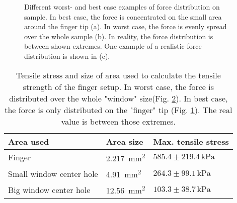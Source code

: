 \begin{figure}[hbt!]
	\centering
	\begin{subfigure}[]{0.3\textwidth}
		\centering
		
		\caption{}
		\label{fig:ZeichnungBerechnungStress_a}
	\end{subfigure}
	\begin{subfigure}[]{0.3\textwidth}
		\centering
		
		\caption{}
		\label{fig:ZeichnungBerechnungStress_b}
	\end{subfigure}
	\begin{subfigure}[]{0.3\textwidth}
		\centering
		
		\caption{}
		\label{fig:ZeichnungBerechnungStress_c}
	\end{subfigure}
	\caption{Different worst- and best case examples of force distribution on sample. In best case, the force is concentrated on the small area around the finger tip (a). In worst case, the force is evenly spread over the whole sample (b). In reality, the force distribution is between shown extremes. One example of a realistic force distribution is shown in (c).}
	\label{fig:ZeichnungBerechnungStress}
\end{figure}


\begin{table}[hbt!]
	\centering
	\begin{tabular}{|l|l|l|}
		\hline
		Area used & Area size & Max. tensile stress\\
		\hline
		\hline
		Finger & \SI{2.217}{\milli\meter\squared} & $585.4\pm219.4\,\si{\kilo\pascal}$ \\ 
		\hline
		Small window center hole & \SI{4.91}{\milli\meter\squared} & $264.3\pm99.1\,\si{\kilo\pascal}$ \\ 
		\hline
		Big window center hole & \SI{12.56}{\milli\meter\squared} & $103.3\pm38.7\,\si{\kilo\pascal}$ \\ 
		\hline
	\end{tabular}
	\caption{Tensile stress and size of area used to calculate the tensile strength of the finger setup. In worst case, the force is distributed over the whole "window" size(Fig. \ref{fig:ZeichnungBerechnungStress_b}). In best case, the force is only distributed on the "finger" tip (Fig. \ref{fig:ZeichnungBerechnungStress_a}). The real value is between those extremes.}
	\label{table:VerschAbschätzungenStressFinger}
\end{table}

